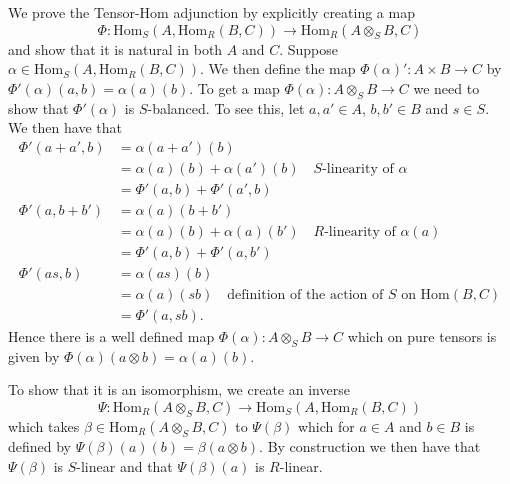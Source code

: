 \documentclass[a4paper]{article}
\begin{document}
\begin{exercise}{5}
  We prove the Tensor-Hom adjunction by explicitly creating a map
  \begin{equation*}
    \Phi: \text{Hom}_S(A, \text{Hom}_R(B, C)) \to \text{Hom}_R(A\otimes_{S}B, C)
  \end{equation*}
  and show that it is natural in both $ A $ and $ C $. Suppose $ \alpha \in \text{Hom}_S(A, \text{Hom}_R(B, C)) $. We then define the map $ \Phi(\alpha)': A \times B \to C $ by $ \Phi'(\alpha)(a,b) = \alpha(a)(b) $. To get a map
  $ \Phi(\alpha): A \otimes_{S} B \to C $ we need to show that $ \Phi'(\alpha) $ is $ S $-balanced. To see this, let $ a,a' \in A $, $ b,b' \in B $ and $ s \in S $. We then have that
  \begin{align*}
    \Phi'(a + a', b) &= \alpha(a+a')(b) \\
                     &= \alpha(a)(b) + \alpha(a')(b) \quad S\text{-linearity of }\alpha \\
                     &= \Phi'(a, b) + \Phi'(a', b) \\
    \Phi'(a, b + b') &= \alpha(a)(b + b') \\
                     &= \alpha(a)(b) + \alpha(a)(b') \quad R\text{-linearity of } \alpha(a) \\
                     &= \Phi'(a, b) + \Phi'(a, b') \\
    \Phi'(as, b) &= \alpha(as)(b) \\
                 &= \alpha(a)(sb) \quad \text{definition of the action of } S\text{ on } \text{Hom}(B,C) \\
                 &= \Phi'(a, sb)
  .\end{align*}
  Hence there is a well defined map $ \Phi(\alpha): A \otimes_{S} B \to C $ which on pure tensors is given by $ \Phi(\alpha)(a\otimes b) = \alpha(a)(b) $.

  To show that it is an isomorphism, we create an inverse
  \begin{equation*}
    \Psi: \text{Hom}_R(A\otimes_{S}B, C) \to \text{Hom}_S(A, \text{Hom}_R(B,C))
  \end{equation*}
  which takes $ \beta \in \text{Hom}_R(A\otimes_{S}B, C) $ to $ \Psi(\beta) $ which for $ a \in A $ and $ b \in B $ is defined by $ \Psi(\beta)(a)(b)= \beta(a \otimes b) $. By construction we then have that $ \Psi(\beta) $ is $ S $-linear and that $ \Psi(\beta)(a) $ is $ R $-linear.


\end{exercise}
\end{document}

